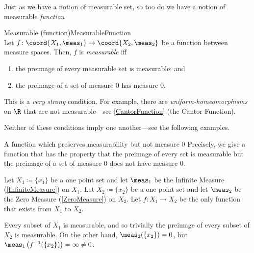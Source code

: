 Just as we have a notion of measurable set, so too do we have a notion of measurable \emph{function}
\begin{dfn}{Measurable (function)}{MeasurableFunction}
\\
Let $f\colon \coord{X_1,\meas _1}\rightarrow \coord{X_2,\meas _2}$ be a function between measure spaces.  Then, $f$ is \emph{measurable} iff
\begin{enumerate}
\item \label{MeasurableFunction.i}the preimage of every measurable set is measurable; and
\item \label{MeasurableFunction.ii}the preimage of a set of measure $0$ has measure $0$.
\end{enumerate}
\begin{rmk}
This is a \emph{very strong} condition.  For example, there are \emph{uniform-homeomorphisms} on $\R$ that are not measurable---see \cref{CantorFunction} (the Cantor Function).
\end{rmk}
\begin{rmk}
Neither of these conditions imply one another---see the following examples.
\end{rmk}
\end{dfn}
\begin{exm}{A function which preserves measurability but not measure $0$}{}
Precisely, we give a function that has the property that the preimage of every set is measurable but the preimage of a set of measure $0$ does not have measure $0$.

Let $X_1\coloneqq \{ x_1\}$ be a one point set and let $\meas _1$ be the Infinite Measure (\cref{InfiniteMeasure}) on $X_1$.  Let $X_2\coloneqq \{ x_2\}$ be a one point set and let $\meas _2$ be the Zero Measure (\cref{ZeroMeasure}) on $X_2$.  Let $f\colon X_1\rightarrow X_2$ be the only function that exists from $X_1$ to $X_2$.

Every subset of $X_1$ is measurable, and so trivially the preimage of every subset of $X_2$ is measurable.  On the other hand, $\meas _2(\{ x_2\} )=0$, but $\meas _1\left( f^{-1}(\{ x_2\} )\right) =\infty \neq 0$.
\end{exm}
